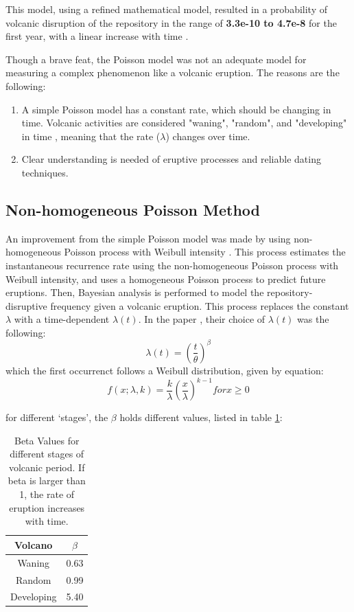 \documentclass[12pt]{article}
\begin{document}
This model, using a refined mathematical model, resulted in a 
probability of volcanic disruption of the repository in the range of 
\textbf{3.3e-10 to 4.7e-8} for the first year, with a linear increase with time \cite{crowe_volcanic_1986}.

Though a brave feat, the Poisson model was not an adequate model for 
measuring a complex phenomenon like a volcanic eruption. The reasons
are the following:

\begin{enumerate}
    \item A simple Poisson model has a constant rate, which should be changing in time. Volcanic
            activities are considered "waning", "random", and "developing" in time \cite{ho_nonhomogeneous_1991}, meaning
            that the rate ($\lambda$) changes over time. 
    \item Clear understanding is needed of eruptive processes and reliable dating techniques.
\end{enumerate}


\subsection{Non-homogeneous Poisson Method}
An improvement from the simple Poisson model was made by using
non-homogeneous Poisson process with Weibull intensity \cite{ho_risk_1992}.
This process estimates the instantaneous recurrence rate using the
non-homogeneous Poisson process with Weibull intensity, and uses 
a homogeneous Poisson process to predict future eruptions.
Then, Bayesian analysis is performed to model the repository-disruptive frequency
given a volcanic eruption. This process replaces the constant $\lambda$ with
a time-dependent $\lambda(t)$. In the paper \cite{ho_risk_1992}, their choice of 
$\lambda(t)$ was the following:
\[ \lambda(t) = (\frac{t}{\theta})^{\beta}\]
which the first occurrenct follows a Weibull distribution, given by equation:
\[f(x;\lambda, k) = \frac{k}{\lambda} (\frac{x}{\lambda})^{k-1} for x\geq 0 \]

for different `stages', the $\beta$ holds different values, listed in table \ref{tab:beta}:

\begin{table}[h]
    \centering
        \begin{tabular}{cc}
            \hline
            \textbf{Volcano} & \textbf{$\beta$} \\ \hline
            Waning & 0.63 \\
            Random & 0.99 \\
            Developing & 5.40 \\
            \hline
       \end{tabular}
        \caption{Beta Values for different stages of volcanic period. If beta is larger than
                 1, the rate of eruption increases with time.}
        \label{tab:beta}
\end {table}
\end{document}
